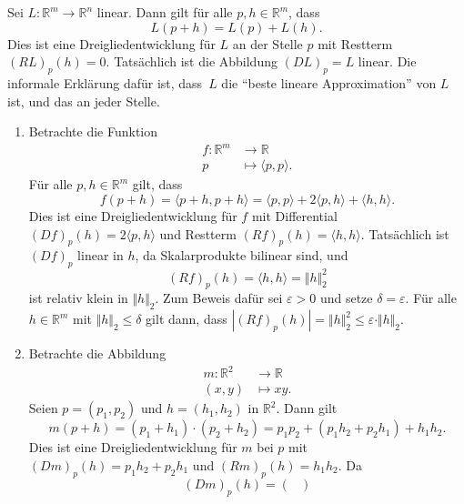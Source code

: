 \documentclass[../main.tex]{subfiles}
\begin{document}
\begin{example}
  Sei $L \colon \mathbb{R}^m \to \mathbb{R}^n$ linear.
  Dann gilt für alle $p, h \in \mathbb{R}^m$,
  dass
  \[
    L(p + h) = L(p) + L(h).
  \]
  Dies ist eine Dreigliedentwicklung für $L$
  an der Stelle $p$ mit Restterm ${(RL)}_p(h) = 0$.
  Tatsächlich ist die Abbildung ${(DL)}_p = L$ linear.
  Die informale Erklärung dafür ist,
  dass~$L$ die ``beste lineare Approximation'' von $L$
  ist, und das an jeder Stelle.
\end{example}

\begin{examples}
  \leavevmode
  \begin{enumerate}[(1)]
    \item Betrachte die Funktion
      \begin{align*}
        f \colon \mathbb{R}^m & \to \mathbb{R} \\
        p & \mapsto \langle p, p \rangle.
      \end{align*}
      Für alle $p, h \in \mathbb{R}^m$ gilt, dass
      \[
        f(p+ h) = \langle p + h, p + h \rangle
        = \langle p, p \rangle + 2 \langle p, h \rangle + \langle h, h \rangle.
      \]
      Dies ist eine Dreigliedentwicklung für $f$ mit
      Differential
      ${(Df)}_p(h) = 2 \langle p, h \rangle$ und
      Restterm
      ${(Rf)}_p(h) = \langle h, h \rangle$.
      Tatsächlich ist ${(Df)}_p$ linear in $h$,
      da Skalarprodukte bilinear sind, und
      \[
        {(Rf)}_p(h) = \langle h, h \rangle = \Vert h \Vert_2^2
      \]
      ist relativ klein in $\Vert h \Vert_2$.
      Zum Beweis dafür sei $\varepsilon > 0$ und setze
      $\delta = \varepsilon$.
      Für alle $h \in \mathbb{R}^m$ mit $\Vert h \Vert_2 \leq \delta$
      gilt dann, dass
      \(
        |{(Rf)}_p(h)| = \Vert h \Vert_2^2 \leq \varepsilon \cdot \Vert h \Vert_2
      \).
    \item Betrachte die Abbildung
      \begin{align*}
        m \colon \mathbb{R}^2 & \to \mathbb{R} \\
        (x, y) & \mapsto xy.
      \end{align*}
      Seien $p = (p_1, p_2)$ und $h = (h_1, h_2)$ in $\mathbb{R}^2$.
      Dann gilt
      \[
        m(p + h) = (p_1 + h_1) \cdot (p_2 + h_2)
        = p_1 p_2 + (p_1 h_2 + p_2 h_1) + h_1 h_2.
      \]
      Dies ist eine Dreigliedentwicklung für $m$ bei $p$
      mit ${(Dm)}_p(h) = p_1 h_2 + p_2 h_1$ und
      ${(Rm)}_p(h) = h_1 h_2$.
      Da
      \[
        {(Dm)}_p(h) =
        \begin{pmatrix}

\end{pmatrix}\]
\end{enumerate}
\end{examples}
\end{document}
